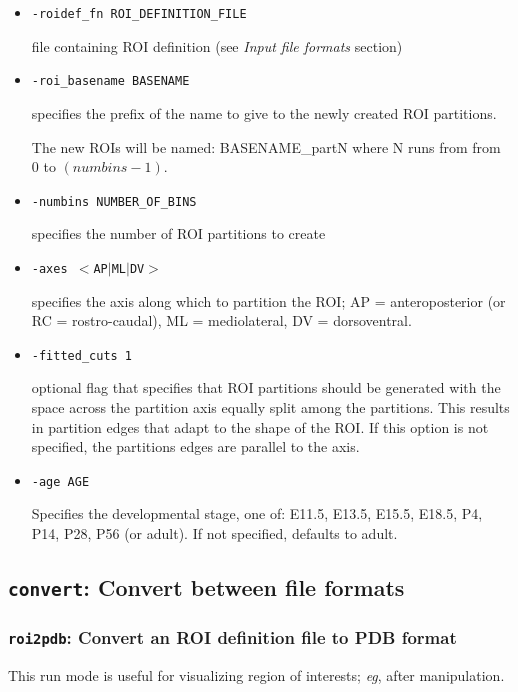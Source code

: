 \documentclass[10pt]{article}
\begin{document}
\begin{itemize}
\item {\tt -roidef\_fn ROI\_DEFINITION\_FILE}
   
file containing ROI definition (see {\it Input file formats} section)

\item {\tt -roi\_basename BASENAME}

specifies the prefix of the name to give to the newly created ROI partitions.

The new ROIs will be named: BASENAME\_partN where N runs from from 0 to $(numbins - 1)$.

\item {\tt -numbins NUMBER\_OF\_BINS}

specifies the number of ROI partitions to create

\item {\tt -axes $<$AP$|$ML$|$DV$>$}

specifies the axis along which to partition the ROI; AP = anteroposterior (or RC = rostro-caudal), ML = mediolateral, DV = dorsoventral.

\item {\tt -fitted\_cuts 1}

optional flag that specifies that ROI partitions should be generated with the space across the partition axis equally split among the partitions. This results in partition edges that adapt to the shape of the ROI. If this option is not specified, the partitions edges are parallel to the axis.

\item {\tt -age AGE}

Specifies the developmental stage, one of: E11.5, E13.5, E15.5, E18.5, P4, P14, P28, P56 (or adult). If not specified, defaults to adult.

\end{itemize}

\subsection{{\tt convert}: Convert between file formats}

\subsubsection*{{\tt roi2pdb}: Convert an ROI definition file to PDB format}

This run mode is useful for visualizing region of interests; {\it eg}, after manipulation.
\end{document}
